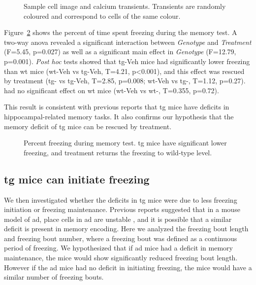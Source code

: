 \begin{figure}[h]
    
    \caption[Sample cell image and calcium transients.]{Sample cell image and calcium transients. Transients are randomly coloured and correspond to cells of the same colour. \label{f.ad.trace}}
\end{figure}


Figure~\ref{f.ad.freezing} shows the percent of time spent freezing during the memory test. A two-way \gls{anova} revealed a significant interaction between \textit{Genotype} and \textit{Treatment} (F=5.45, p=0.027) as well as a significant main effect in \textit{Genotype} (F=12.79, p=0.001).  \textit{Post hoc} tests showed that \gls{tg}-Veh mice had significantly lower freezing than \gls{wt} mice (\gls{wt}-Veh vs \gls{tg}-Veh, T=4.21, p<0.001), and this effect was rescued by \tglu{} treatment (\gls{tg}-\glu{} vs \gls{tg}-Veh, T=2.85, p=0.008; \gls{wt}-Veh vs \gls{tg}-\glu, T=1.12, p=0.27). \tglu{} had no significant effect on \gls{wt} mice (\gls{wt}-Veh vs \gls{wt}-\glu, T=0.355, p=0.72). 

This result is consistent with previous reports \citep{palmer11, zhou16} that \gls{tg} mice have deficits in hippocampal-related memory tasks. It also confirms our hypothesis that the memory deficit of \gls{tg} mice can be rescued by \tglu{} treatment. 

\begin{figure}[h]
    
    \caption[Percent of freezing during memory test.]{Percent freezing during memory test. \Gls{tg} mice have significant lower freezing, and \tglu{} treatment returns the freezing to wild-type level. \label{f.ad.freezing}}
\end{figure}

\subsection{\Gls{tg} mice can initiate freezing}
We then investigated whether the deficits in \gls{tg} mice were due to less freezing initiation or freezing maintenance. Previous reports suggested that in a mouse model of \gls{ad}, place cells in \gls{ad} are unstable \citep{cheng13}, and it is possible that a similar deficit is present in memory encoding. Here we analyzed the freezing bout length and freezing bout number, where a freezing bout was defined as a continuous period of freezing. We hypothesized that if  \gls{ad} mice had a deficit in memory maintenance, the mice would show significantly reduced freezing bout length. However if the \gls{ad} mice had no deficit in initiating freezing, the mice would have a similar number of freezing bouts.

